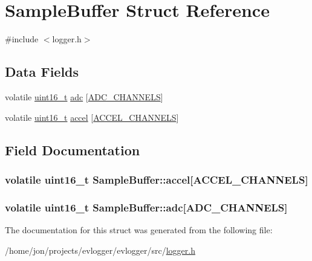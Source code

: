 \hypertarget{structSampleBuffer}{\section{\-Sample\-Buffer \-Struct \-Reference}
\label{structSampleBuffer}
}


{\ttfamily \#include $<$logger.\-h$>$}

\subsection*{\-Data \-Fields}
\begin{DoxyCompactItemize}
\item 
volatile \hyperlink{typedefs_8h_a1f1825b69244eb3ad2c7165ddc99c956}{uint16\-\_\-t} \hyperlink{structSampleBuffer_a3d99620683fe3563724b2914f022568d}{adc} \mbox{[}\hyperlink{logger_8h_a065dcfa648ca52ed6214008cb177de36}{\-A\-D\-C\-\_\-\-C\-H\-A\-N\-N\-E\-L\-S}\mbox{]}
\item 
volatile \hyperlink{typedefs_8h_a1f1825b69244eb3ad2c7165ddc99c956}{uint16\-\_\-t} \hyperlink{structSampleBuffer_a9a64a06367799bad845e62d42b473269}{accel} \mbox{[}\hyperlink{logger_8h_a97ed3fe57790c99c8e351a42713c604d}{\-A\-C\-C\-E\-L\-\_\-\-C\-H\-A\-N\-N\-E\-L\-S}\mbox{]}
\end{DoxyCompactItemize}


\subsection{\-Field \-Documentation}
\hypertarget{structSampleBuffer_a9a64a06367799bad845e62d42b473269}{
\subsubsection[{accel}]{\setlength{\rightskip}{0pt plus 5cm}volatile {\bf uint16\-\_\-t} {\bf \-Sample\-Buffer\-::accel}\mbox{[}{\bf \-A\-C\-C\-E\-L\-\_\-\-C\-H\-A\-N\-N\-E\-L\-S}\mbox{]}}}\label{structSampleBuffer_a9a64a06367799bad845e62d42b473269}
\hypertarget{structSampleBuffer_a3d99620683fe3563724b2914f022568d}{
\subsubsection[{adc}]{\setlength{\rightskip}{0pt plus 5cm}volatile {\bf uint16\-\_\-t} {\bf \-Sample\-Buffer\-::adc}\mbox{[}{\bf \-A\-D\-C\-\_\-\-C\-H\-A\-N\-N\-E\-L\-S}\mbox{]}}}\label{structSampleBuffer_a3d99620683fe3563724b2914f022568d}


\-The documentation for this struct was generated from the following file\-:\begin{DoxyCompactItemize}
\item 
/home/jon/projects/evlogger/evlogger/src/\hyperlink{logger_8h}{logger.\-h}\end{DoxyCompactItemize}
